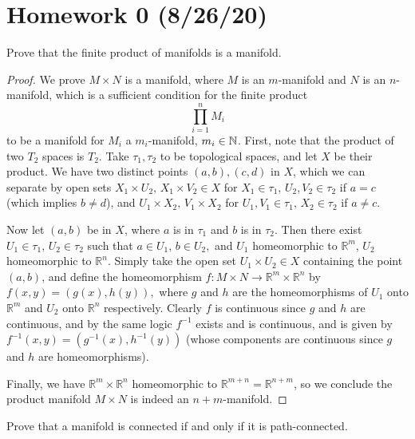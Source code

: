 \section*{Homework 0 (8/26/20)}
\begin{problem}
    Prove that the finite product of manifolds is a manifold.
\end{problem}
\begin{proof}
    We prove $M \times N$ is a manifold, where $M$ is an $m$-manifold and $N$ is an $n$-manifold, which is a sufficient condition for the finite product 
\[
    \prod_{i=1}^n M_{i}
\]
to be a manifold for $M_i$ a $m_i$-manifold, $m_i \in \mathbb{N}$. First, note that the product of two $T_2$ spaces is $T_2$. Take $\tau_1, \tau_2$ to be topological spaces, and let $X$ be their product. We have two distinct points $(a,b), (c,d)$ in $X$, which we can separate by open sets $X_1 \times U_2, \, X_1 \times V_2 \in X$ for $X_1 \in \tau_1, \, U_2, V_2 \in \tau_2$ if $a = c$ (which implies $b \neq d$), and  $U_1 \times X_2, \, V_1 \times X_2$ for $U_1, V_1 \in \tau_1, \, X_2 \in \tau_2$ if $a \neq c.$ 

Now let $(a,b)$ be in $X$, where $a$ is in $\tau_1$ and $b$ is in $\tau_2.$ Then there exist $U_1 \in \tau_1, \, U_2 \in \tau_2$ such that $a \in U_1, \, b\in U_2,$ and $U_1$ homeomorphic to $\mathbb{R}^m$, $U_2$ homeomorphic to $\mathbb{R}^n.$ Simply take the open set $U_1 \times U_2 \in X$ containing the point $(a,b)$, and define the homeomorphism $f: M \times N \to \mathbb{R}^m \times \mathbb{R}^n$ by  $f(x,y)=(g(x),h(y)),$ where $g$ and $h$ are the homeomorphisms of $U_1$ onto $\mathbb{R}^m$ and $U_2$ onto $\mathbb{R}^n$ respectively. Clearly $f$ is continuous since $g$ and $h$ are continuous, and by the same logic $f^{-1}$ exists and is continuous, and is given by $f^{-1}(x,y) = (g^{-1}(x),h^{-1}(y))$ (whose components are continuous since $g$ and $h$ are homeomorphisms).

Finally, we have $\mathbb{R}^m \times \mathbb{R}^n$ homeomorphic to $\mathbb{R}^{m+n}=\mathbb{R}^{n+m}$, so we conclude the product manifold $M \times N$ is indeed an $n+m$-manifold.
\end{proof}
\vspace{10mm}

\begin{problem}
    Prove that a manifold is connected if and only if it is path-connected.
\end{problem}

